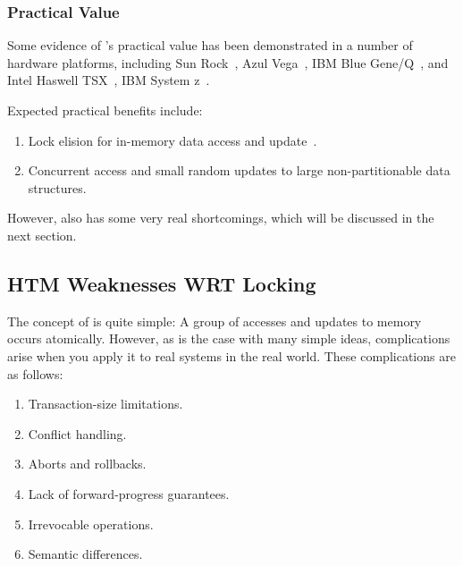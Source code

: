 \QuickQuizEnd

\subsubsection{Practical Value}
\label{sec:future:Practical Value}

Some evidence of 's practical value has been demonstrated in a number
of hardware platforms, including
Sun Rock~\cite{DaveDice2009ASPLOSRockHTM},
Azul Vega~\cite{CliffClick2009AzulHTM},
IBM Blue Gene/Q~\cite{RickMerrit2011PowerTM}, and
Intel Haswell TSX~\cite{RaviRajwar2012TSX},
IBM System z~\cite{ChristianJacobi2012MainframeTM}.

Expected practical benefits include:

\begin{enumerate}
\item	Lock elision for in-memory data access and
	update~\cite{Martinez01a,Rajwar02a}.
\item	Concurrent access and small random updates to large non-partitionable
	data structures.
\end{enumerate}

However,  also has some very real shortcomings, which will be discussed
in the next section.

\subsection{HTM Weaknesses WRT Locking}
\label{sec:future:HTM Weaknesses WRT Locking}

The concept of  is quite simple: A group of accesses and updates to
memory occurs atomically.
However, as is the case with many simple ideas, complications arise
when you apply it to real systems in the real world.
These complications are as follows:

\begin{enumerate}
\item	Transaction-size limitations.
\item	Conflict handling.
\item	Aborts and rollbacks.
\item	Lack of forward-progress guarantees.
\item	Irrevocable operations.
\item	Semantic differences.
\end{enumerate}

